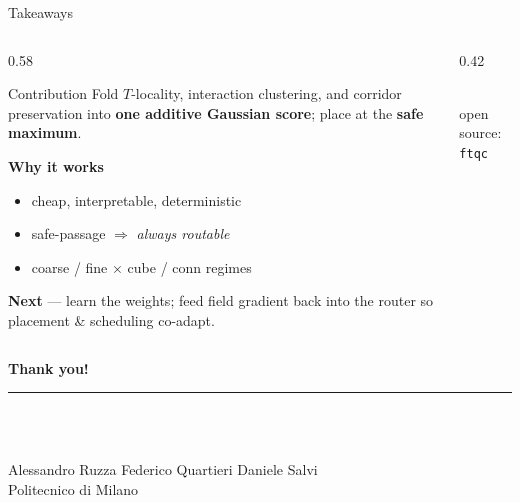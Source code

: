 \documentclass[aspectratio=169,10pt]{beamer}
\newcommand{\latgrid}[2]{%
  \foreach \xx in {0,...,#1}\foreach \yy in {0,...,#2}{%
     \node[free] at (\xx,\yy) {};}}
\begin{document}
\begin{frame}{Takeaways}
  \begin{columns}[c]
  \begin{column}{0.58\textwidth}
    \begin{block}{Contribution}
      \footnotesize
      Fold $T$-locality, interaction clustering, and corridor preservation into \textbf{one additive Gaussian score}; place at the \textbf{safe maximum}.
    \end{block}
    \vspace{2pt}
    \footnotesize
    \textbf{Why it works}
    \begin{itemize}
      \item cheap, interpretable, deterministic
      \item safe-passage $\Rightarrow$ \emph{always routable}
      \item coarse / fine $\times$ cube / conn regimes
    \end{itemize}
    \vspace{4pt}
    \textbf{Next} --- learn the weights; feed field gradient back into the router so placement \& scheduling co-adapt.
  \end{column}
  \begin{column}{0.42\textwidth}
    \centering
    \\[4pt]
    {\scriptsize\color{ftgray} open source: \texttt{ftqc}}
  \end{column}
  \end{columns}
\end{frame}

{
\begin{frame}[plain]
  \centering
  \vspace{1.3cm}
  {\color{ftblue}\Large\bfseries Thank you!}\\[6pt]
  {\color{ftorange}\rule{0.4\textwidth}{1pt}}\\[10pt]
  \\[8pt]
  {\small Alessandro Ruzza \;\textbar\; Federico Quartieri \;\textbar\; Daniele Salvi}\\
  {\color{ftgray}\small Politecnico di Milano}
\end{frame}}
\end{document}
